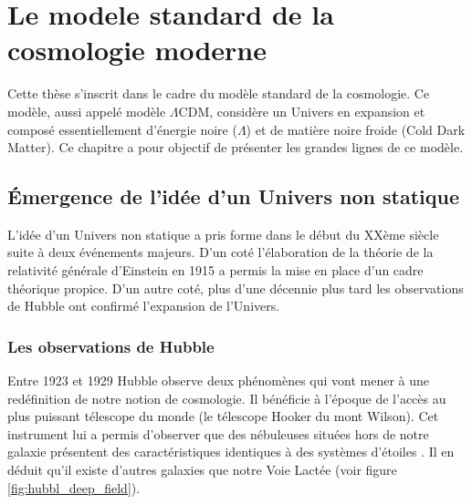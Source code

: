 
\chapter{Le modele standard de la cosmologie moderne}
 \label{ch:introduction_physique}

Cette thèse s'inscrit dans le cadre du modèle standard de la cosmologie.
Ce modèle, aussi appelé modèle $\Lambda$CDM, considère un Univers en expansion et composé essentiellement d'énergie noire ($\Lambda$) et de matière noire froide (Cold Dark Matter). 
Ce chapitre a pour objectif de présenter les grandes lignes de ce modèle.

\section{Émergence de l'idée d'un Univers non statique}



L'idée d'un Univers non statique a pris forme dans le début du XXème siècle suite à deux événements majeurs.
D'un coté l'élaboration de la théorie de la relativité générale d'Einstein en 1915 a permis la mise en place d'un cadre théorique propice.
D'un autre coté, plus d'une décennie plus tard les observations de Hubble ont confirmé l'expansion de l'Univers.

\subsection{Les observations de Hubble}

Entre 1923 et 1929 Hubble observe deux phénomènes qui vont mener à une redéfinition de notre notion de cosmologie.
Il bénéficie à l'époque de l'accès au plus puissant télescope du monde (le télescope Hooker du mont Wilson).
Cet instrument lui a permis d'observer que des nébuleuses situées hors de notre galaxie présentent des caractéristiques identiques à des systèmes d'étoiles \citep{1926ApJ....63..236H}.
Il en déduit qu'il existe d'autres galaxies que notre Voie Lactée (voir figure \ref{fig:hubbl_deep_field}).

